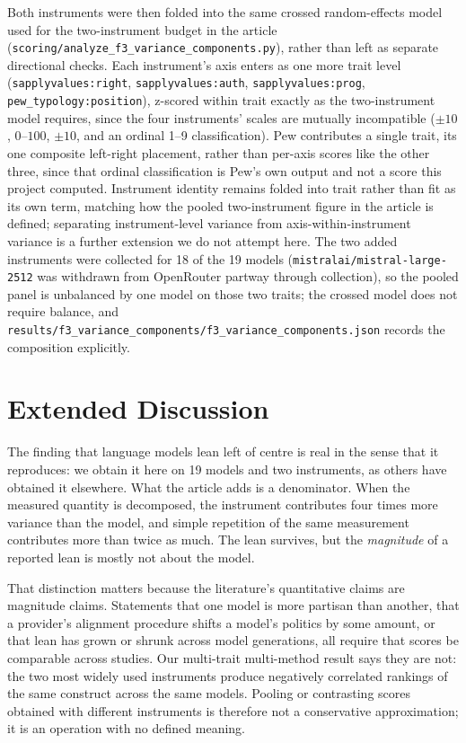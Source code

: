 \documentclass[11pt]{article}
\begin{document}
Both instruments were then folded into the same crossed random-effects model
used for the two-instrument budget in the article
(\texttt{scoring/analyze\_f3\_variance\_components.py}), rather than left as
separate directional checks. Each instrument's axis enters as one more
trait level (\texttt{sapplyvalues:right}, \texttt{sapplyvalues:auth},
\texttt{sapplyvalues:prog}, \texttt{pew\_typology:position}), z-scored
within trait exactly as the two-instrument model requires, since the four
instruments' scales are mutually incompatible ($\pm10$, $0$--$100$, $\pm10$,
and an ordinal 1--9 classification). Pew contributes a single trait, its one
composite left-right placement, rather than per-axis scores like the other
three, since that ordinal classification is Pew's own output and not a
score this project computed. Instrument identity remains folded into trait
rather than fit as its own term, matching how the pooled two-instrument
figure in the article is defined; separating instrument-level variance from
axis-within-instrument variance is a further extension we do not attempt
here. The two added instruments were collected for 18 of the 19 models
(\texttt{mistralai/mistral-large-2512} was withdrawn from OpenRouter
partway through collection), so the pooled panel is unbalanced by one model
on those two traits; the crossed model does not require balance, and
\texttt{results/f3\_variance\_components/f3\_variance\_components.json}
records the composition explicitly.

\section{Extended Discussion}
\label{si:scope}

The finding that language models lean left of centre is real in the sense
that it reproduces: we obtain it here on 19 models and two instruments, as
others have obtained it elsewhere. What the article adds is a denominator.
When the measured quantity is decomposed, the instrument contributes four
times more variance than the model, and simple repetition of the same
measurement contributes more than twice as much. The lean survives, but the
\emph{magnitude} of a reported lean is mostly not about the model.

That distinction matters because the literature's quantitative claims are
magnitude claims. Statements that one model is more partisan than another,
that a provider's alignment procedure shifts a model's politics by some
amount, or that lean has grown or shrunk across model generations, all
require that scores be comparable across studies. Our multi-trait
multi-method result says they are not: the two most widely used instruments
produce negatively correlated rankings of the same construct across the
same models. Pooling or contrasting scores obtained with different
instruments is therefore not a conservative approximation; it is an
operation with no defined meaning.
\end{document}
